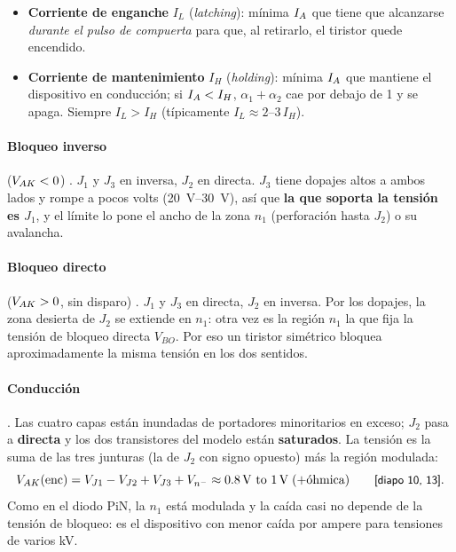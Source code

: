 \begin{definicion}
\begin{itemize}
  \item \textbf{Corriente de enganche} $I_L$ (\emph{latching}): mínima $I_{A}$ que tiene que alcanzarse
  \emph{durante el pulso de compuerta} para que, al retirarlo, el tiristor quede encendido.
  \item \textbf{Corriente de mantenimiento} $I_H$ (\emph{holding}): mínima $I_{A}$ que mantiene el
  dispositivo en conducción; si $I_{A}<I_H$, $\alpha_1+\alpha_2$ cae por debajo de 1 y se apaga.
  Siempre $I_L>I_H$ (típicamente $I_L\approx2$--$3\,I_H$).
\end{itemize}
\end{definicion}

\paragraph{Bloqueo inverso} ($V_{AK}<0$) . $J_1$ y $J_3$ en inversa, $J_2$ en directa.
$J_3$ tiene dopajes altos a ambos lados y rompe a pocos volts (\SIrange{20}{30}{V}), así que
\textbf{la que soporta la tensión es $J_1$}, y el límite lo pone el ancho de la zona $n_1$
(perforación hasta $J_2$) o su avalancha.

\paragraph{Bloqueo directo} ($V_{AK}>0$, sin disparo) . $J_1$ y $J_3$ en directa, $J_2$ en
inversa. Por los dopajes, la zona desierta de $J_2$ se extiende en $n_1$: otra vez es la región
$n_1$ la que fija la tensión de bloqueo directa $V_{BO}$. Por eso un tiristor simétrico bloquea
aproximadamente la misma tensión en los dos sentidos.

\paragraph{Conducción} . Las cuatro capas están inundadas de portadores minoritarios en
exceso; $J_2$ pasa a \textbf{directa} y los dos transistores del modelo están \textbf{saturados}.
La tensión es la suma de las tres junturas (la de $J_2$ con signo opuesto) más la región modulada:
\[
  \VAK(\mathrm{enc})=V_{J1}-V_{J2}+V_{J3}+V_{n^-}\approx\SIrange{0.8}{1}{V}\;(+\text{óhmica}) \qquad\text{\diapo{10, 13}}.
\]
Como en el diodo PiN, la $n_1$ está modulada y la caída casi no depende de la tensión de bloqueo:
es el dispositivo con menor caída por ampere para tensiones de varios kV.

